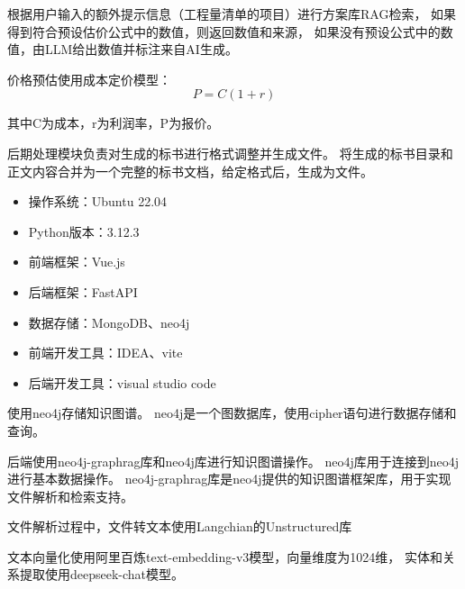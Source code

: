 \documentclass{xmu}
\begin{document}
根据用户输入的额外提示信息（工程量清单的项目）进行方案库RAG检索，
如果得到符合预设估价公式中的数值，则返回数值和来源，
如果没有预设公式中的数值，由LLM给出数值并标注来自AI生成。

价格预估使用成本定价模型：
\begin{equation}
    P = C (1+r)
\end{equation}

其中C为成本，r为利润率，P为报价。

后期处理模块负责对生成的标书进行格式调整并生成文件。
将生成的标书目录和正文内容合并为一个完整的标书文档，给定格式后，生成为文件。
    \begin{itemize}
        \item 操作系统：Ubuntu 22.04
        \item Python版本：3.12.3
    \end{itemize}
    \begin{itemize}
        \item 前端框架：Vue.js
        \item 后端框架：FastAPI
        \item 数据存储：MongoDB、neo4j
    \end{itemize}
    \begin{itemize}
        \item 前端开发工具：IDEA、vite
        \item 后端开发工具：visual studio code
    \end{itemize}
    使用neo4j存储知识图谱。
    neo4j是一个图数据库，使用cipher语句进行数据存储和查询。

    后端使用neo4j-graphrag库和neo4j库进行知识图谱操作。
    neo4j库用于连接到neo4j进行基本数据操作。
    neo4j-graphrag库是neo4j提供的知识图谱框架库，用于实现文件解析和检索支持。

    文件解析过程中，文件转文本使用Langchian的Unstructured库
    
    文本向量化使用阿里百炼text-embedding-v3模型，向量维度为1024维，
    实体和关系提取使用deepseek-chat模型。
    
\end{document}

